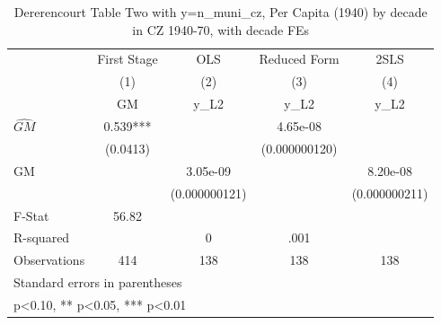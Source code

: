 \begin{table}[htbp]\centering
\def\sym#1{\ifmmode^{#1}\else\(^{#1}\)\fi}
\caption{Dererencourt Table Two with y=n\_muni\_cz, Per Capita (1940) by decade in CZ 1940-70, with decade FEs}
\begin{tabular}{l*{4}{c}}
\toprule
                    & First Stage   &         OLS   &Reduced Form   &        2SLS   \\
                    &\multicolumn{1}{c}{(1)}&\multicolumn{1}{c}{(2)}&\multicolumn{1}{c}{(3)}&\multicolumn{1}{c}{(4)}\\
                    &\multicolumn{1}{c}{GM}&\multicolumn{1}{c}{y\_L2}&\multicolumn{1}{c}{y\_L2}&\multicolumn{1}{c}{y\_L2}\\
\midrule
$\hat{GM}$          &       0.539***&               &    4.65e-08   &               \\
                    &    (0.0413)   &               &(0.000000120)   &               \\
\addlinespace
GM                  &               &    3.05e-09   &               &    8.20e-08   \\
                    &               &(0.000000121)   &               &(0.000000211)   \\
\midrule
F-Stat              &       56.82   &               &               &               \\
R-squared           &               &           0   &        .001   &               \\
Observations        &         414   &         138   &         138   &         138   \\
\bottomrule
\multicolumn{5}{l}{\footnotesize Standard errors in parentheses}\\
\multicolumn{5}{l}{\footnotesize * p<0.10, ** p<0.05, *** p<0.01}\\
\end{tabular}
\end{table}
